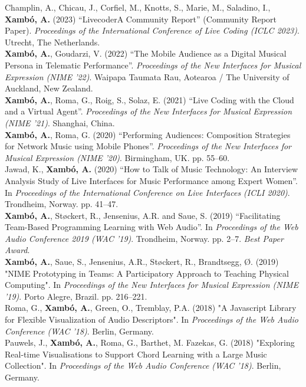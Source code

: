 \documentclass[10pt, a4paper]{article}
\newcommand{\years}[1]{\marginnote{\scriptsize #1}}
\begin{document}
{{{\years{2023}Champlin, A., Chicau, J., Corfiel, M., Knotts, S., Marie, M., Saladino, I., \textbf{Xambó, A.} (2023) ``LivecoderA Community Report'' (Community Report Paper). \emph{Proceedings of the International Conference of Live Coding (ICLC 2023)}. Utrecht, The Netherlands.}\\
{\years{2022}\textbf{Xambó, A.}, Goudarzi, V. (2022) ``The Mobile Audience as a Digital Musical Persona in Telematic Performance''. \emph{Proceedings of the New Interfaces for Musical Expression (NIME '22)}. Waipapa Taumata Rau, Aotearoa / The University of Auckland, New Zealand.}\\
{\years{2021}\textbf{Xambó, A.}, Roma, G., Roig, S., Solaz, E. (2021) ``Live Coding with the Cloud and a Virtual Agent''. \emph{Proceedings of the New Interfaces for Musical Expression (NIME '21)}. Shanghai, China.}\\
{\years{2020b}\textbf{Xambó, A.}, Roma, G. (2020) ``Performing Audiences: Composition Strategies for Network Music using Mobile Phones''. \emph{Proceedings of the New Interfaces for Musical Expression (NIME '20)}. Birmingham, UK. pp. 55--60.}\\
\years{2020a}Jawad, K., \textbf{Xambó, A.} (2020) ``How to Talk of Music Technology: An Interview Analysis Study of Live Interfaces for Music Performance among Expert Women''. In \emph{Proceedings of the International Conference on Live Interfaces (ICLI 2020)}. Trondheim, Norway. pp. 41--47.\\
\years{2019b}\textbf{Xambó, A.}, Støckert, R., Jensenius, A.R. and Saue, S. (2019) ``Facilitating Team-Based Programming Learning with Web Audio''. In \emph{Proceedings of the Web Audio Conference 2019 (WAC '19)}. Trondheim, Norway. pp. 2--7. \emph{Best Paper Award}.\\
\years{2019a}\textbf{Xambó, A.}, Saue, S., Jensenius, A.R., Støckert, R., Brandtsegg, Ø. (2019) "NIME Prototyping in Teams: A Participatory Approach to Teaching Physical Computing". In \emph{Proceedings of the New Interfaces for Musical Expression (NIME ’19)}. Porto Alegre, Brazil. pp. 216–221.\\
\years{2018f}Roma, G., \textbf{Xambó, A.}, Green, O., Tremblay, P.A. (2018) "A Javascript Library for Flexible Visualization of Audio Descriptors". In \emph{Proceedings of the Web Audio Conference (WAC '18)}. Berlin, Germany.\\
\years{2018e}Pauwels, J., \textbf{Xambó, A.}, Roma, G., Barthet, M. Fazekas, G. (2018) "Exploring Real-time Visualisations to Support Chord Learning with a Large Music Collection". In \emph{Proceedings of the Web Audio Conference (WAC '18)}. Berlin, Germany.\\
}}
\end{document}

